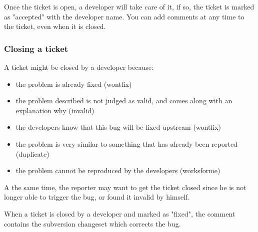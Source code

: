 Once the ticket is open, a developer will take care of it, if so, the ticket is marked
as "accepted" with the developer name. You can add comments at any time to the ticket,
even when it is closed.

\subsubsection{Closing a ticket}

A ticket might be closed by a developer because:

\begin{itemize}
\item the problem is already fixed (wontfix)
\item the problem described is not judged as valid, and comes along with an explanation why (invalid)
\item the developers know that this bug will be fixed upstream (wontfix)
\item the problem is very similar to something that has already been reported (duplicate)
\item the problem cannot be reproduced by the developers (worksforme)
\end{itemize}

A the same time, the reporter may want to get the ticket closed since he is not 
longer able to trigger the bug, or found it invalid by himself.

When a ticket is closed by a developer and marked as "fixed", the comment contains 
the subversion changeset which corrects the bug.
